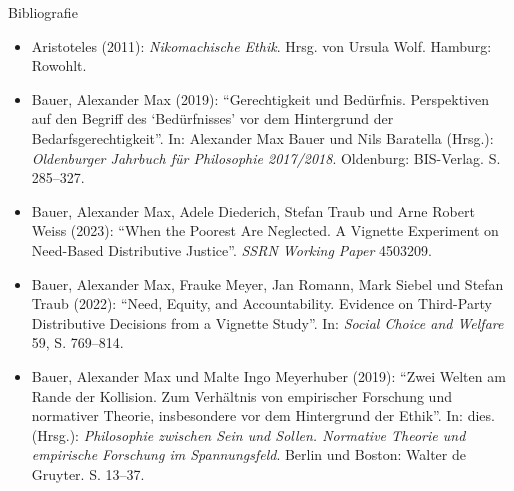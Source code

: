 \documentclass[xcolor=table,9pt,aspectratio=169]{beamer}
\begin{document}
\begin{frame}{\vspace*{10mm}Bibliografie}
\vspace*{-5mm}
{\footnotesize
\begin{itemize}[label=,leftmargin=2em,itemindent=-2em]
   \item Aristoteles (2011): \textit{Nikomachische Ethik}. Hrsg. von Ursula Wolf. Hamburg: Rowohlt.
   \item Bauer, Alexander Max (2019): \enquote{Gerechtigkeit und Bedürfnis. Perspektiven auf den Begriff des \enquote{Bedürfnisses} vor dem Hintergrund der Bedarfsgerechtigkeit}. In: Alexander Max Bauer und Nils Baratella (Hrsg.): \textit{Oldenburger Jahrbuch für Philosophie 2017/2018}. Oldenburg: BIS-Verlag. S. 285--327.
   \item Bauer, Alexander Max, Adele Diederich, Stefan Traub und Arne Robert Weiss (2023): \enquote{When the Poorest Are Neglected. A Vignette Experiment on Need-Based Distributive Justice}. \textit{SSRN Working Paper} 4503209.
   \item Bauer, Alexander Max, Frauke Meyer, Jan Romann, Mark Siebel und Stefan Traub (2022): \enquote{Need, Equity, and Accountability. Evidence on Third-Party Distributive Decisions from a Vignette Study}. In: \textit{Social Choice and Welfare} 59, S. 769--814.
   \item Bauer, Alexander Max und Malte Ingo Meyerhuber (2019): \enquote{Zwei Welten am Rande der Kollision. Zum Verhältnis von empirischer Forschung und normativer Theorie, insbesondere vor dem Hintergrund der Ethik}. In: dies. (Hrsg.): \textit{Philosophie zwischen Sein und Sollen. Normative Theorie und empirische Forschung im Spannungsfeld}. Berlin und Boston: Walter de Gruyter. S. 13--37.
\end{itemize}
}
\end{frame}
\end{document}
